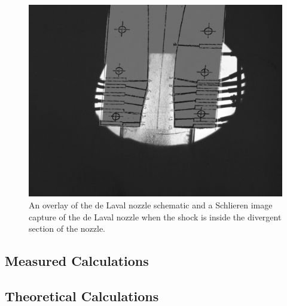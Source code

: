 \begin{figure}[htpb]
    \centering
    \includegraphics[width=\linewidth]{Figures/Nozzle Overlay with Shock.jpg}
    \caption[An overlay of the de Laval nozzle schematic and an image of the nozzle when a normal shock is present.]{An overlay of the de Laval nozzle schematic and a Schlieren image capture of the de Laval nozzle when the shock is inside the divergent section of the nozzle.}
    \label{fig:schlieren_overlay}
\end{figure}

\subsection{Measured Calculations} \label{sec:measured_calculations}


\subsection{Theoretical Calculations} \label{sec:theoretical_calculations}
